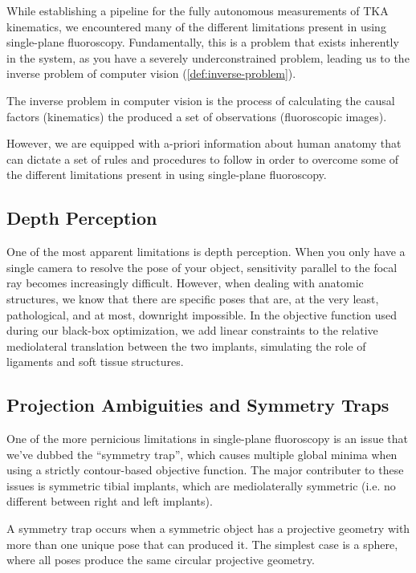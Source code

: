 While establishing a pipeline for the fully autonomous measurements of TKA kinematics, we encountered many of the different limitations present in using single-plane fluoroscopy. Fundamentally, this is a problem that exists inherently in the system, as you have a severely underconstrained problem, leading us to the inverse problem of computer vision (\cref{def:inverse-problem}).

\begin{mdframed}
    \begin{definition}
        The inverse problem in computer vision is the process of calculating the causal factors (kinematics) the produced a set of observations (fluoroscopic images).
        \label{def:inverse-problem}
    \end{definition}
\end{mdframed}

However, we are equipped with a-priori information about human anatomy that can dictate a set of rules and procedures to follow in order to overcome some of the different limitations present in using single-plane fluoroscopy.

\subsection{Depth Perception}
One of the most apparent limitations is depth perception. When you only have a single camera to resolve the pose of your object, sensitivity parallel to the focal ray becomes increasingly difficult. However, when dealing with anatomic structures, we know that there are specific poses that are, at the very least, pathological, and at most, downright impossible. In the objective function used during our black-box optimization, we add linear constraints to the relative mediolateral translation between the two implants, simulating the role of ligaments and soft tissue structures. 

\subsection{Projection Ambiguities and Symmetry Traps}

One of the more pernicious limitations in single-plane fluoroscopy is an issue that we've dubbed the ``symmetry trap'', which causes multiple global minima when using a strictly contour-based objective function. The major contributer to these issues is symmetric tibial implants, which are mediolaterally symmetric (i.e. no different between right and left implants).

\begin{mdframed}
    \begin{definition}
        A symmetry trap occurs when a symmetric object has a projective geometry with more than one unique pose that can produced it. The simplest case is a sphere, where all poses produce the same circular projective geometry.
    \end{definition}
\end{mdframed}